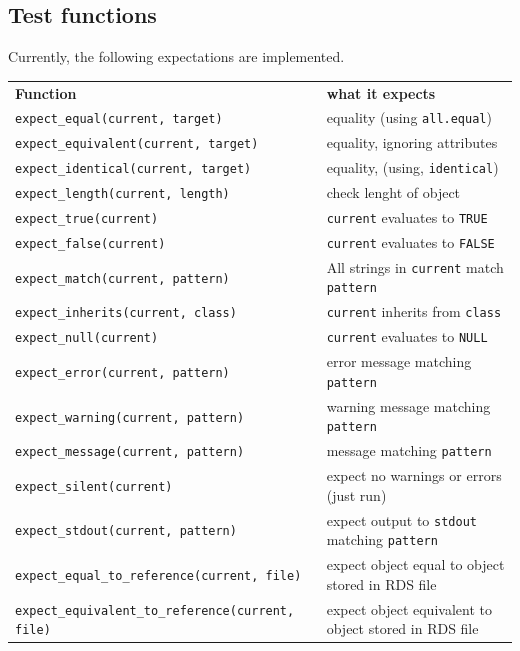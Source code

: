 \documentclass[11pt]{article}
\newcommand{\code}[1]{\texttt{#1}}
\begin{document}
\subsection{Test functions}
Currently, the following expectations are implemented.
\begin{center}
\begin{tabular}{ll}
\textbf{Function} & \textbf{what it expects}\\
\code{expect\_equal(current, target)}      & equality (using \code{all.equal})\\
\code{expect\_equivalent(current, target)} & equality, ignoring attributes\\
\code{expect\_identical(current, target)}  & equality, (using, \code{identical})\\
\code{expect\_length(current, length)}     & check lenght of object\\
\code{expect\_true(current)}               & \code{current} evaluates to \code{TRUE}\\
\code{expect\_false(current)}              & \code{current} evaluates to \code{FALSE}\\
\code{expect\_match(current, pattern)}     & All strings in \code{current} match \code{pattern}\\
\code{expect\_inherits(current, class)}    & \code{current} inherits from \code{class}\\
\code{expect\_null(current)}               & \code{current} evaluates to \code{NULL}\\
\code{expect\_error(current, pattern)}     & error message matching \code{pattern}\\
\code{expect\_warning(current, pattern)}   & warning message matching \code{pattern}\\
\code{expect\_message(current, pattern)}   & message matching \code{pattern}\\
\code{expect\_silent(current)}             & expect no warnings or errors (just run)\\
\code{expect\_stdout(current, pattern)}    & expect output to \code{stdout} matching \code{pattern}\\
\code{expect\_equal\_to\_reference(current, file)} & expect object equal to object stored in RDS file\\
\code{expect\_equivalent\_to\_reference(current, file)} & expect object equivalent to object stored in RDS file\\

\end{tabular}
\end{center}
\end{document}
